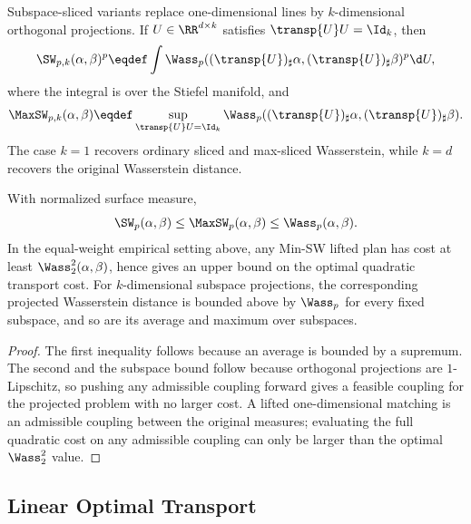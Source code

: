 \begin{defn}\label{def-subspace-sliced-wasserstein}
	Subspace-sliced variants replace one-dimensional lines by $k$-dimensional orthogonal projections. If $U\in\RR^{d\times k}$ satisfies $\transp{U}U=\Id_k$, then
	\[
		\SW_{p,k}(\alpha,\beta)^p
		\eqdef
		\int \Wass_p((\transp{U})_\sharp\alpha,(\transp{U})_\sharp\beta)^p\d U,
	\]
	where the integral is over the Stiefel manifold, and
	\[
		\MaxSW_{p,k}(\alpha,\beta)
		\eqdef
		\sup_{\transp{U}U=\Id_k}
		\Wass_p((\transp{U})_\sharp\alpha,(\transp{U})_\sharp\beta).
	\]
	The case $k=1$ recovers ordinary sliced and max-sliced Wasserstein, while $k=d$ recovers the original Wasserstein distance.
\end{defn}

\begin{prop}\label{prop-sliced-variant-bounds}
	With normalized surface measure,
	\[
		\SW_p(\alpha,\beta)
		\leq
		\MaxSW_p(\alpha,\beta)
		\leq
		\Wass_p(\alpha,\beta).
	\]
	In the equal-weight empirical setting above, any Min-SW lifted plan has cost at least $\Wass_2^2(\alpha,\beta)$, hence gives an upper bound on the optimal quadratic transport cost. For $k$-dimensional subspace projections, the corresponding projected Wasserstein distance is bounded above by $\Wass_p$ for every fixed subspace, and so are its average and maximum over subspaces.
\end{prop}

\begin{proof}
	The first inequality follows because an average is bounded by a supremum. The second and the subspace bound follow because orthogonal projections are $1$-Lipschitz, so pushing any admissible coupling forward gives a feasible coupling for the projected problem with no larger cost. A lifted one-dimensional matching is an admissible coupling between the original measures; evaluating the full quadratic cost on any admissible coupling can only be larger than the optimal $\Wass_2^2$ value.
\end{proof}

\subsection{Linear Optimal Transport}
\label{sec-linear-ot}

